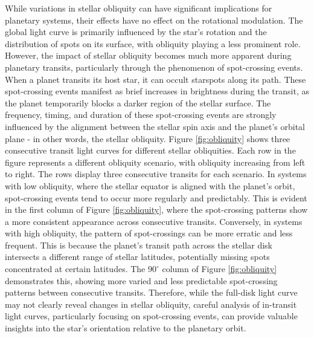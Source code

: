 \documentclass[twocolumn]{aastex631}
\begin{document}
While variations in stellar obliquity can have significant implications for planetary systems, their effects have no effect on the rotational modulation. The global light curve is primarily influenced by the star's rotation and the distribution of spots on its surface, 
with obliquity playing a less prominent role. However, the impact of stellar obliquity becomes much more apparent during planetary transits, 
particularly through the phenomenon of spot-crossing events. When a planet transits its host star, it can occult starspots along its path. 
These spot-crossing events manifest as brief increases in brightness during the transit, as the planet temporarily blocks a darker region of the stellar 
surface. The frequency, timing, and duration of these spot-crossing events are strongly influenced by the alignment between the stellar spin axis and 
the planet's orbital plane - in other words, the stellar obliquity. Figure \ref{fig:obliquity} shows three consecutive transit light curves for 
different stellar obliquities. Each row in the figure represents a different obliquity scenario, with obliquity increasing from left to right. 
The rows display three consecutive transits for each scenario. 
In systems with low obliquity, where the stellar equator is aligned with the 
planet's orbit, spot-crossing events tend to occur more regularly and predictably. This is evident in the first column of Figure \ref{fig:obliquity}, where the spot-crossing patterns show a more consistent appearance across consecutive transits. 
Conversely, in systems with high obliquity, the pattern of spot-crossings can be more erratic and less frequent. This is because the planet's transit path across 
the stellar disk intersects a different range of stellar latitudes, potentially missing spots concentrated at certain latitudes. The $90^\circ$ column of 
Figure \ref{fig:obliquity} demonstrates this, showing more varied and less predictable spot-crossing patterns between consecutive transits. 
Therefore, while the full-disk light curve may not clearly reveal changes in stellar obliquity, careful analysis of in-transit light curves, 
particularly focusing on spot-crossing events, can provide valuable insights into the star's orientation relative to the planetary orbit. 
\end{document}

